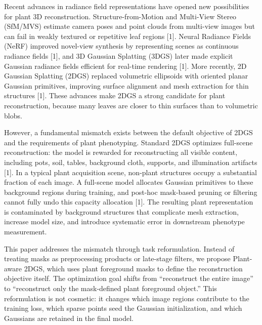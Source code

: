 \documentclass[11pt,a4paper]{article}
\begin{document}
Recent advances in radiance field representations have opened new
possibilities for plant 3D reconstruction. Structure-from-Motion and
Multi-View Stereo (SfM/MVS) estimate camera poses and point clouds from
multi-view images but can fail in weakly textured or repetitive leaf
regions {[}1{]}. Neural Radiance Fields (NeRF) improved novel-view
synthesis by representing scenes as continuous radiance fields {[}1{]},
and 3D Gaussian Splatting (3DGS) later made explicit Gaussian radiance
fields efficient for real-time rendering {[}1{]}. More recently, 2D
Gaussian Splatting (2DGS) replaced volumetric ellipsoids with oriented
planar Gaussian primitives, improving surface alignment and mesh
extraction for thin structures {[}1{]}. These advances make 2DGS a
strong candidate for plant reconstruction, because many leaves are
closer to thin surfaces than to volumetric blobs.

However, a fundamental mismatch exists between the default objective of
2DGS and the requirements of plant phenotyping. Standard 2DGS optimizes
full-scene reconstruction: the model is rewarded for reconstructing all
visible content, including pots, soil, tables, background cloth,
supports, and illumination artifacts {[}1{]}. In a typical plant
acquisition scene, non-plant structures occupy a substantial fraction of
each image. A full-scene model allocates Gaussian primitives to these
background regions during training, and post-hoc mask-based pruning or
filtering cannot fully undo this capacity allocation {[}1{]}. The
resulting plant representation is contaminated by background structures
that complicate mesh extraction, increase model size, and introduce
systematic error in downstream phenotype measurement.

This paper addresses the mismatch through task reformulation. Instead of
treating masks as preprocessing products or late-stage filters, we
propose Plant-aware 2DGS, which uses plant foreground masks to define
the reconstruction objective itself. The optimization goal shifts from
``reconstruct the entire image'' to ``reconstruct only the mask-defined
plant foreground object.'' This reformulation is not cosmetic: it
changes which image regions contribute to the training loss, which
sparse points seed the Gaussian initialization, and which Gaussians are
retained in the final model.
\end{document}
